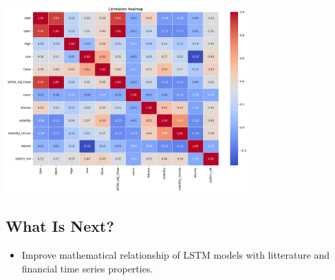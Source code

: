 \documentclass[letterpaper,11pt]{article}
\begin{document}
\begin{center}
  \includegraphics[width=0.7\textwidth]{img/corr_matrixS.png}
  \end{center}

\subsection*{What Is Next?}
\begin{itemize} 
  \item Improve mathematical relationship of LSTM models with litterature and financial time series properties.
 
\end{itemize}
\end{document}
